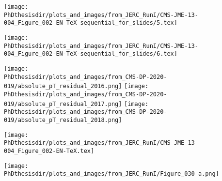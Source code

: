 \begin{frame}[t]
\addtocounter{framenumber}{-1}
\large
\texttt{[image: \\PhDthesisdir/plots\_and\_images/from\_JERC\_RunI/CMS-JME-13-004\_Figure\_002-EN-TeX-sequential\_for\_slides/5.tex]}
\end{frame}

\begin{frame}[t]
\addtocounter{framenumber}{-1}
\large
\texttt{[image: \\PhDthesisdir/plots\_and\_images/from\_JERC\_RunI/CMS-JME-13-004\_Figure\_002-EN-TeX-sequential\_for\_slides/6.tex]}

\vfill

\texttt{[image: \\PhDthesisdir/plots\_and\_images/from\_CMS-DP-2020-019/absolute\_pT\_residual\_2016.png]}
\hfill
\texttt{[image: \\PhDthesisdir/plots\_and\_images/from\_CMS-DP-2020-019/absolute\_pT\_residual\_2017.png]}
\hfill
\texttt{[image: \\PhDthesisdir/plots\_and\_images/from\_CMS-DP-2020-019/absolute\_pT\_residual\_2018.png]}
\end{frame}

\begin{frame}[t]
\addtocounter{framenumber}{-1}
\large
\texttt{[image: \\PhDthesisdir/plots\_and\_images/from\_JERC\_RunI/CMS-JME-13-004\_Figure\_002-EN-TeX.tex]}

\vfill

\begin{center}
\texttt{[image: \\PhDthesisdir/plots\_and\_images/from\_JERC\_RunI/Figure\_030-a.png]}
\end{center}
\end{frame}

